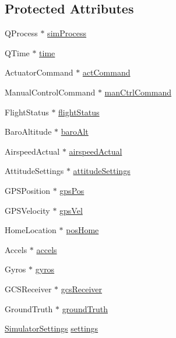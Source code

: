 \subsection*{Protected Attributes}
\begin{DoxyCompactItemize}
\item 
Q\-Process $\ast$ \hyperlink{group___h_i_t_l_plugin_ga28f5833f779eb659394e6c6cfe6f2331}{sim\-Process}
\item 
Q\-Time $\ast$ \hyperlink{group___h_i_t_l_plugin_ga162228fbfec7737c989bfe0b340e8617}{time}
\item 
Actuator\-Command $\ast$ \hyperlink{group___h_i_t_l_plugin_ga9362d7e2619934460d6f8070496d336f}{act\-Command}
\item 
Manual\-Control\-Command $\ast$ \hyperlink{group___h_i_t_l_plugin_ga1af06e35c7befb4f3ffd0bfee9a6efc2}{man\-Ctrl\-Command}
\item 
Flight\-Status $\ast$ \hyperlink{group___h_i_t_l_plugin_ga2c3a29dc6471574d7182db7691e69a56}{flight\-Status}
\item 
Baro\-Altitude $\ast$ \hyperlink{group___h_i_t_l_plugin_ga107f3bf3d4cc0c45cc8677742d4445eb}{baro\-Alt}
\item 
Airspeed\-Actual $\ast$ \hyperlink{group___h_i_t_l_plugin_gadba0d3a66c5a15e0027b7d95fc9498b4}{airspeed\-Actual}
\item 
Attitude\-Settings $\ast$ \hyperlink{group___h_i_t_l_plugin_ga4430b724d2151ce662d6b82a3b8ba74a}{attitude\-Settings}
\item 
G\-P\-S\-Position $\ast$ \hyperlink{group___h_i_t_l_plugin_gae4d6ea654494f0de351686d9c35037ca}{gps\-Pos}
\item 
G\-P\-S\-Velocity $\ast$ \hyperlink{group___h_i_t_l_plugin_ga649eab8811fb3f1e6596e48eac2d47c7}{gps\-Vel}
\item 
Home\-Location $\ast$ \hyperlink{group___h_i_t_l_plugin_ga9fcd56565e3cb4d64bc0c71c0a6151c1}{pos\-Home}
\item 
Accels $\ast$ \hyperlink{group___h_i_t_l_plugin_ga35cb24cdab1cfc0d1720b5b58fd0254f}{accels}
\item 
Gyros $\ast$ \hyperlink{group___h_i_t_l_plugin_ga0f9daef3b0fe0731e035f2bff3d9df19}{gyros}
\item 
G\-C\-S\-Receiver $\ast$ \hyperlink{group___h_i_t_l_plugin_gac63d17091bc4377e1b49696355a0ae19}{gcs\-Receiver}
\item 
Ground\-Truth $\ast$ \hyperlink{group___h_i_t_l_plugin_ga6c62059f6d424f96ad1142bfe8885e3a}{ground\-Truth}
\item 
\hyperlink{group___h_i_t_l_plugin_ga052199f1328d3002bce3e45345aa7f4e}{Simulator\-Settings} \hyperlink{group___h_i_t_l_plugin_ga61775246e91fbe43ce9d79c03bfde19f}{settings}

\end{DoxyCompactItemize}
